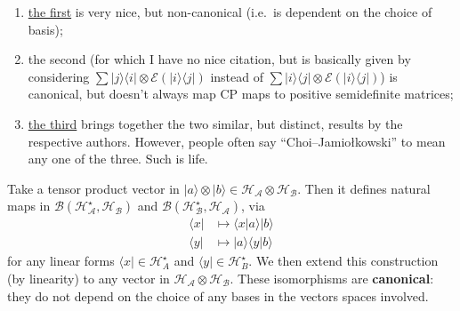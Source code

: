 \documentclass[fleqn]{article}
\providecommand{\tightlist}{%
  \setlength{\itemsep}{0pt}\setlength{\parskip}{0pt}}
\begin{document}
\begin{enumerate}
\def\labelenumi{\arabic{enumi}.}
\tightlist
\item
  \href{https://en.wikipedia.org/wiki/Choi\%27s_theorem_on_completely_positive_maps}{the first} is very nice, but non-canonical (i.e.~is dependent on the choice of basis);
\item
  the second (for which I have no nice citation, but is basically given by considering \(\sum|j\rangle\langle i|\otimes\mathcal{E}(|i\rangle\langle j|)\) instead of \(\sum|i\rangle\langle j|\otimes\mathcal{E}(|i\rangle\langle j|)\)) is canonical, but doesn't always map CP maps to positive semidefinite matrices;
\item
  \href{https://en.wikipedia.org/wiki/Choi\%E2\%80\%93Jamio\%C5\%82kowski_isomorphism}{the third} brings together the two similar, but distinct, results by the respective authors. However, people often say ``Choi--Jamiołkowski'' to mean any one of the three. Such is life.
\end{enumerate}

Take a tensor product vector in \(|a\rangle\otimes|b\rangle\in \mathcal{H}_{\mathcal{A}}\otimes\mathcal{H}_{\mathcal{B}}\).
Then it defines natural maps in \(\mathscr{B}(\mathcal{H}_{\mathcal{A}}^\star,\mathcal{H}_{\mathcal{B}})\) and \(\mathscr{B}(\mathcal{H}_{\mathcal{B}}^\star,\mathcal{H}_{\mathcal{A}})\), via
\[
  \begin{aligned}
    \langle x|
    &\longmapsto \langle x|a\rangle|b\rangle
  \\\langle y|
    &\longmapsto |a\rangle\langle y|b\rangle
  \end{aligned}
\]
for any linear forms \(\langle x|\in\mathcal{H}^\star_A\) and \(\langle y|\in\mathcal{H}^\star_B\).
We then extend this construction (by linearity) to any vector in \(\mathcal{H}_{\mathcal{A}}\otimes\mathcal{H}_{\mathcal{B}}\).
These isomorphisms are \textbf{canonical}: they do not depend on the choice of any bases in the vectors spaces involved.
\end{document}
